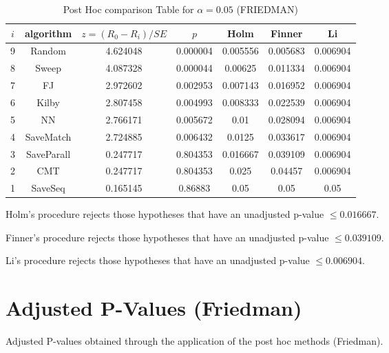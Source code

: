 \documentclass[a4paper,10pt]{article}
\begin{document}
\begin{landscape}
\begin{table}[!htp]
\centering\footnotesize
\begin{tabular}{ccccccc}
$i$&algorithm&$z=(R_0 - R_i)/SE$&$p$&Holm &Finner&Li\\
\hline9&Random&4.624048&0.000004&0.005556&0.005683&0.006904\\8&Sweep&4.087328&0.000044&0.00625&0.011334&0.006904\\7&FJ&2.972602&0.002953&0.007143&0.016952&0.006904\\6&Kilby&2.807458&0.004993&0.008333&0.022539&0.006904\\5&NN&2.766171&0.005672&0.01&0.028094&0.006904\\4&SaveMatch&2.724885&0.006432&0.0125&0.033617&0.006904\\3&SaveParall&0.247717&0.804353&0.016667&0.039109&0.006904\\2&CMT&0.247717&0.804353&0.025&0.04457&0.006904\\1&SaveSeq&0.165145&0.86883&0.05&0.05&0.05\\\hline
\end{tabular}
\caption{Post Hoc comparison Table for $\alpha=0.05$ (FRIEDMAN)}
\end{table}Holm's procedure rejects those hypotheses that have an unadjusted p-value $\le0.016667$.

Finner's procedure rejects those hypotheses that have an unadjusted p-value $\le0.039109$.

Li's procedure rejects those hypotheses that have an unadjusted p-value $\le0.006904$.


\newpage

\section{Adjusted P-Values (Friedman)}


Adjusted P-values obtained through the application of the post hoc methods (Friedman).


\end{landscape}
\end{document}
